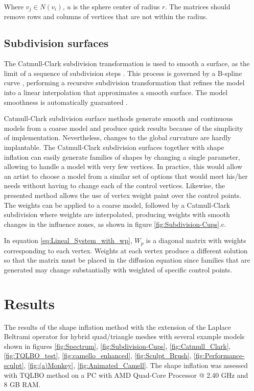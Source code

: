\documentclass[10pt, conference]{IEEEtran}
\begin{document}
Where $v_{j}\in N\left(v_{i}\right)$, $u$ is the sphere center of
radius $r$. The matrices should remove rows and columns of vertices
that are not within the radius.


\subsection{Subdivision surfaces\label{sub:Subdivision-surfaces}}

The Catmull-Clark subdivision transformation is used to smooth a surface,
as the limit of a sequence of subdivision steps \cite{Stam1998}.
This process is governed by a B-spline curve \cite{Loop1987}, performing
a recursive subdivision transformation that refines the model into
a linear interpolation that approximates a smooth surface. The model
smoothness is automatically guaranteed \cite{DeRose1998}. 

Catmull-Clark subdivision surface methods generate smooth and continuous
models from a coarse model and produce quick results because of the
simplicity of implementation. Nevertheless, changes to the global
curvature are hardly implantable. The Catmull-Clark subdivision surfaces
together with shape inflation can easily generate families of shapes
by changing a single parameter, allowing to handle a model with very
few vertices. In practice, this would allow an artist to choose a
model from a similar set of options that would meet his/her needs
without having to change each of the control vertices. Likewise, the
presented method allows the use of vertex weight paint over the control
points. The weights can be applied to a coarse model, followed by
a Catmull-Clark subdivision where weights are interpolated, producing
weights with smooth changes in the influence zones, as shown in figure
\ref{fig:Subdivision-Cups}.c.

In equation \ref{eq:Lineal_System_with_wp}, $W_{p}$ is a diagonal
matrix with weights corresponding to each vertex. Weights at each
vertex produce a different solution so that the matrix must be placed
in the diffusion equation since families that are generated may change
substantially with weighted of specific control points.


\section{Results\label{sec:Results}}

The results of the shape inflation method with the extension of
the Laplace Beltrami operator for hybrid quad/triangle meshes with
several example models shown in figures  \ref{fig:Spectrum}, \ref{fig:Subdivision-Cups},
\ref{fig:Catmull_Clark}, \ref{fig:TQLBO_test}, \ref{fig:camello_enhanced},
\ref{fig:Sculpt_Brush}, \ref{fig:Performance-sculpt}, \ref{fig:(a)Monkey},
\ref{fig:Animated_Camell}. The shape inflation was assessed with
TQLBO method on a PC with AMD Quad-Core Processor @ 2.40 GHz and 8
GB RAM.
\end{document}

